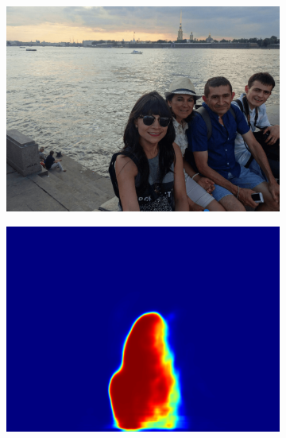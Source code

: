 \begin{figure}
	\centering
    \begin{subfigure}[b]{0.27\columnwidth}
            \centering
            \includegraphics[width=\textwidth]{./figures/sample_image.png}
    \label{subfig:original_img}
    \end{subfigure}
    \begin{subfigure}[b]{0.27\columnwidth}
            \centering
            \includegraphics[width=\textwidth]{./figures/Mask_1.png}
    \label{subfig:woman_left}
    \end{subfigure}
     \begin{subfigure}[b]{0.27\columnwidth}

\end{subfigure}
\end{figure}
